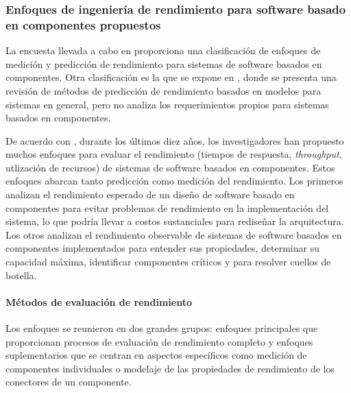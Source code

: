 \subsubsection{Enfoques de ingeniería de rendimiento para software basado en componentes propuestos}
La encuesta llevada a cabo en \cite{Koziolek:2010:PEC:1808359.1808729} proporciona una clasificación de enfoques de medición y predicción de rendimiento para sistemas de software basados en componentes. Otra clasificación es la que se expone en \cite{1291833}, donde se presenta una revisión de métodos de predicción de rendimiento basados en modelos para sistemas en general, pero no analiza los requerimientos propios para sistemas basados en componentes. 

De acuerdo con \cite{Koziolek:2010:PEC:1808359.1808729}, durante los últimos diez años, los investigadores han propuesto muchos enfoques para evaluar el rendimiento (tiempos de respuesta, \emph{throughput}, utlización de recursos) de sistemas de software basados en componentes. Estos enfoques abarcan tanto predicción como medición del rendimiento. Los primeros analizan el rendimiento esperado de un diseño de software basado en componentes para evitar problemas de rendimiento en la implementación del sistema, lo que podría llevar a costos sustanciales para rediseñar la arquitectura. Los otros analizan el rendimiento observable de sistemas de software basados en componentes implementados para entender sus propiedades, determinar su capacidad máxima, identificar componentes críticos y para resolver cuellos de botella.

\paragraph{Métodos de evaluación de rendimiento}
Los enfoques se reunieron en dos grandes grupos: enfoques principales que proporcionan procesos de evaluación de rendimiento completo y enfoques suplementarios que se centran en aspectos específicos como medición de componentes individuales o modelaje de las propiedades de rendimiento de los conectores de un componente.

